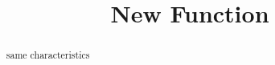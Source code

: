 \documentclass{ximera}
\title{New Function}
\begin{document}
\begin{abstract}
same characteristics
\end{abstract}
\maketitle
\end{document}
